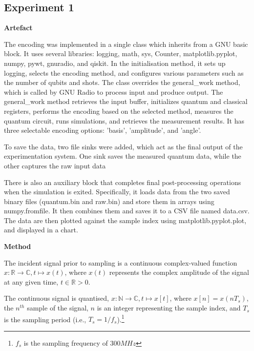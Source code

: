 \subsection{Experiment 1}

\textbf{Artefact}

The encoding was implemented in a single class which inherits from a GNU basic block.
It uses several libraries: logging, math, sys, Counter, matplotlib.pyplot, numpy, pywt, gnuradio, and qiskit.
In the initialisation method, it sets up logging, selects the encoding method, and configures various parameters such as the number of qubits and shots.
The class overrides the general\_work method, which is called by GNU Radio to process input and produce output.
The general\_work method retrieves the input buffer, initializes quantum and classical registers, performs the encoding based on the selected method, measures the quantum circuit, runs simulations, and retrieves the measurement results.
It has three selectable encoding options: 'basis', 'amplitude', and 'angle'.

To save the data, two file sinks were added, which act as the final output of the experimentation system. One sink saves the measured quantum data, while the other captures the raw input data

There is also an auxiliary block that completes final post-processing operations when the simulation is exited.
Specifically, it loads data from the two saved binary files (quantum.bin and raw.bin) and store them in arrays using numpy.fromfile.
It then combines them and saves it to a CSV file named data.csv.
The data are then plotted against the sample index using matplotlib.pyplot.plot, and displayed in a chart.

\textbf{Method}

The incident signal prior to sampling is a continuous complex-valued function
$x : \mathbb{R} \rightarrow \mathbb{C}, t \mapsto x(t)$,
where $x(t)$ represents the complex amplitude of the signal at any given time, $t \in \mathbb{R} > 0$.

The continuous signal is quantised,
$x : \mathbb{N} \rightarrow \mathbb{C}, t \mapsto x[t]$,
where $x[n] = x(n T_s)$, the $n^{th}$ sample of the signal, $n$ is an integer representing the sample index, and $T_s$ is the sampling period (i.e., $T_s = 1/f_s$).\footnote{$f_s$ is the sampling frequency of $300MHz$}


